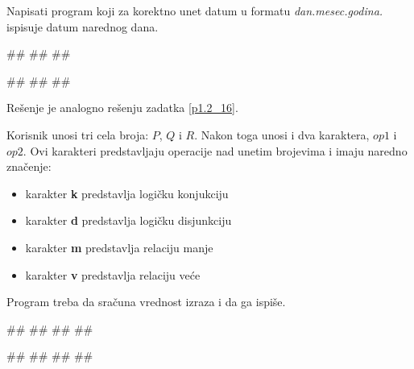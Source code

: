 \begin{Exercise}[label=p1.2_17] 
 Napisati program koji za korektno unet datum u formatu \textit{dan.mesec.godina.} ispisuje datum narednog dana. 
 
\begin{miditest}
\begin{upotreba}{1}
#\naslovInt#
##
##
\end{upotreba}
\end{miditest}
\begin{miditest}
\begin{upotreba}{2}
#\naslovInt#
##
##
\end{upotreba}
\end{miditest}
\end{Exercise}
\ifresenja
 \begin{Answer}[ref=p1.2_17]
Rešenje je analogno rešenju zadatka \ref{p1.2_16}.
\end{Answer}
\fi




\begin{Exercise}[label=p1.9_]
Korisnik unosi tri cela broja: $P$, $Q$ i $R$.
Nakon toga unosi i dva karaktera, $op1$ i $op2$. Ovi karakteri predstavljaju operacije nad unetim brojevima i imaju naredno značenje:
\begin{itemize}
\item karakter \textbf{k} predstavlja  logičku konjukciju
\item karakter \textbf{d} predstavlja  logičku disjunkciju
\item karakter \textbf{m} predstavlja  relaciju manje
\item karakter \textbf{v} predstavlja  relaciju veće
\end{itemize}
Program treba da sračuna vrednost izraza 
 i da ga ispiše.

\begin{miditest}
\begin{upotreba}{1}
#\naslovInt#
##
##
##
\end{upotreba}
\end{miditest}
\begin{miditest}
\begin{upotreba}{2}
#\naslovInt#
##
##
##
\end{upotreba}
\end{miditest}

\end{Exercise}


